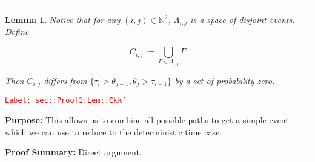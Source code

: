 \documentclass[12pt]{article}
\newcommand{\mb}{\mathbb}
\newcommand{\tr}{\textcolor{red}}
\newcommand{\labe}[1]{\tr{\texttt{Label: #1}}}
\newcommand{\purpose}{\textbf{Purpose: }}
\newcommand{\pfsum}{\textbf{Proof Summary: }}
\newcommand{\lin}{\rule{\linewidth}{0.4 pt}}
\newcommand{\indx}[1]{_{#1}}					%
\newcommand{\rt}{\tau}							%
\newcommand{\rtt}{\theta}						%
\newcommand{\apath}{\Gamma}						%
\newcommand{\pathset}[2]{\Lambda_{#1,#2}}		%
\newcommand{\pathsete}[2]{C_{#1,#2}}			%
\newtheorem{lem}[thms]{Lemma}
\begin{document}
\lin

\begin{lem}
Notice that for any \((i,j) \in \mb{N}^2\), \(\pathset{i}{j}\) is a space of disjoint events. Define

\[\pathsete{i}{j} := \bigcup_{\apath\in\pathset{i}{j}} \apath\]

Then \(\pathsete{i}{j}\) differs from \(\{\rt\indx{i} > \rtt\indx{j-1}, \rtt\indx{j} > \rt\indx{i-1}\}\) by a set of probability zero.
\label{sec::Proof1:Lem::Ckk'}
\end{lem}
\labe{sec::Proof1:Lem::Ckk'}

\purpose This allows us to combine all possible paths to get a simple event which we can use to reduce to the deterministic time case.

\pfsum Direct argument.
\end{document}
